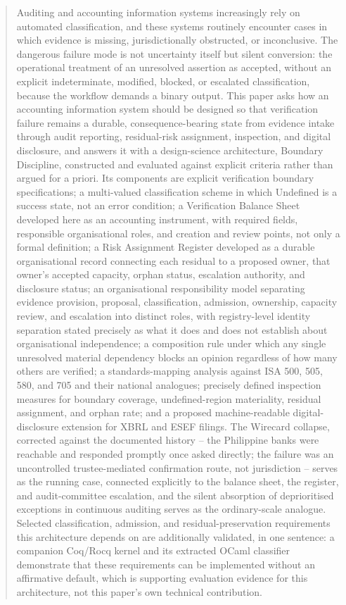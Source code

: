 \documentclass[11pt,a4paper]{article}
\theoremstyle{definition}
\theoremstyle{remark}
\begin{document}
\begin{abstract}
Auditing and accounting information systems increasingly rely on automated classification, and these systems routinely encounter cases in which evidence is missing, jurisdictionally obstructed, or inconclusive. The dangerous failure mode is not uncertainty itself but silent conversion: the operational treatment of an unresolved assertion as accepted, without an explicit indeterminate, modified, blocked, or escalated classification, because the workflow demands a binary output. This paper asks how an accounting information system should be designed so that verification failure remains a durable, consequence-bearing state from evidence intake through audit reporting, residual-risk assignment, inspection, and digital disclosure, and answers it with a design-science architecture, Boundary Discipline, constructed and evaluated against explicit criteria rather than argued for a priori. Its components are explicit verification boundary specifications; a multi-valued classification scheme in which \textsf{Undefined} is a success state, not an error condition; a Verification Balance Sheet developed here as an accounting instrument, with required fields, responsible organisational roles, and creation and review points, not only a formal definition; a Risk Assignment Register developed as a durable organisational record connecting each residual to a proposed owner, that owner's accepted capacity, orphan status, escalation authority, and disclosure status; an organisational responsibility model separating evidence provision, proposal, classification, admission, ownership, capacity review, and escalation into distinct roles, with registry-level identity separation stated precisely as what it does and does not establish about organisational independence; a composition rule under which any single unresolved material dependency blocks an opinion regardless of how many others are verified; a standards-mapping analysis against ISA 500, 505, 580, and 705 and their national analogues; precisely defined inspection measures for boundary coverage, undefined-region materiality, residual assignment, and orphan rate; and a proposed machine-readable digital-disclosure extension for XBRL and ESEF filings. The Wirecard collapse, corrected against the documented history -- the Philippine banks were reachable and responded promptly once asked directly; the failure was an uncontrolled trustee-mediated confirmation route, not jurisdiction -- serves as the running case, connected explicitly to the balance sheet, the register, and audit-committee escalation, and the silent absorption of deprioritised exceptions in continuous auditing serves as the ordinary-scale analogue. Selected classification, admission, and residual-preservation requirements this architecture depends on are additionally validated, in one sentence: a companion Coq/Rocq kernel and its extracted OCaml classifier demonstrate that these requirements can be implemented without an affirmative default, which is supporting evaluation evidence for this architecture, not this paper's own technical contribution.
\end{abstract}
\end{document}
